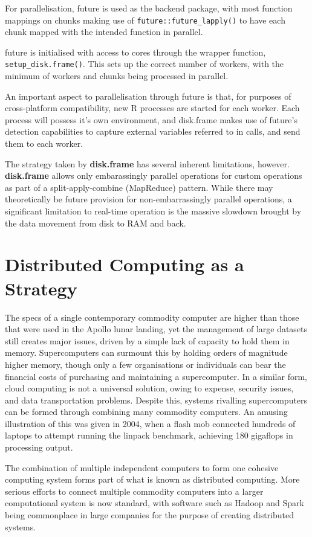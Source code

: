 \documentclass[a4paper,10pt]{article}
\begin{document}
For parallelisation, future is used as the backend package, with most function mappings on chunks making use of \texttt{future::future\_lapply()} to have each chunk mapped with the intended function in parallel. 

future is initialised with access to cores through the wrapper function, \texttt{setup\_disk.frame()}\cite{zj19:_key}. 
This sets up the correct number of workers, with the minimum of workers and chunks being processed in parallel.

An important aspect to parallelisation through future is that, for purposes of cross-platform compatibility, new R processes are started for each worker\cite{zj19:_using}. 
Each process will possess it's own environment, and disk.frame makes use of future's detection capabilities to capture external variables referred to in calls, and send them to each worker.

The strategy taken by \textbf{disk.frame} has several inherent limitations, however.
\textbf{disk.frame} allows only embarassingly parallel operations for custom operations as part of a split-apply-combine (MapReduce) pattern. 
While there may theoretically be future provision for non-embarrassingly parallel operations, a significant limitation to real-time operation is the massive slowdown brought by the data movement from disk to RAM and back.

\section{Distributed Computing as a Strategy}
\label{dist}
The specs of a single contemporary commodity computer are higher than those that were used in the Apollo lunar landing, yet the management of large datasets still creates major issues, driven by a simple lack of  capacity to hold them in memory.
Supercomputers can surmount this by holding orders of magnitude higher memory, though only a few organisations or individuals can bear the financial costs of purchasing and maintaining a supercomputer. 
In a similar form, cloud computing is not a universal solution, owing to expense, security issues, and data transportation problems.
Despite this, systems rivalling supercomputers can be formed through combining many commodity computers.
An amusing illustration of this was given in 2004, when a flash mob connected hundreds of laptops to attempt running the linpack benchmark, achieving 180 gigaflops in processing output\cite{perry2004flashcomp}.

The combination of multiple independent computers to form one cohesive computing system forms part of what is known as distributed computing.
More serious efforts to connect multiple commodity computers into a larger computational system is now standard, with software such as Hadoop and Spark being commonplace in large companies for the purpose of creating distributed systems.
\end{document}
